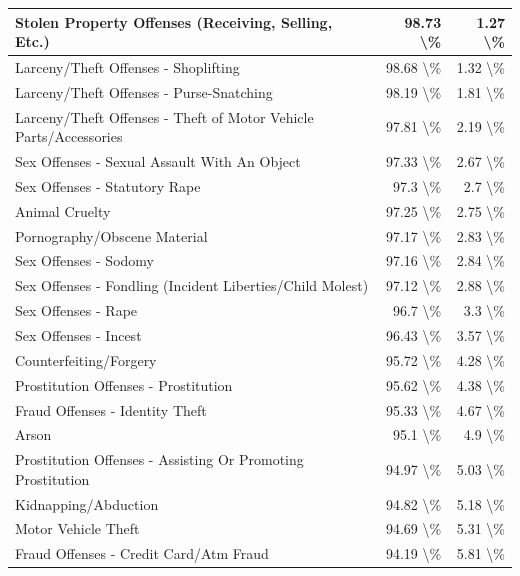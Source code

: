 \documentclass[
]{krantz}
\begin{document}
\begin{longtable}[t]{l|r|r}
\hline
Stolen Property Offenses (Receiving, Selling, Etc.) & 98.73 \textbackslash{}\% & 1.27 \textbackslash{}\%\\
\hline
Larceny/Theft Offenses - Shoplifting & 98.68 \textbackslash{}\% & 1.32 \textbackslash{}\%\\
\hline
Larceny/Theft Offenses - Purse-Snatching & 98.19 \textbackslash{}\% & 1.81 \textbackslash{}\%\\
\hline
Larceny/Theft Offenses - Theft of Motor Vehicle Parts/Accessories & 97.81 \textbackslash{}\% & 2.19 \textbackslash{}\%\\
\hline
Sex Offenses - Sexual Assault With An Object & 97.33 \textbackslash{}\% & 2.67 \textbackslash{}\%\\
\hline
Sex Offenses - Statutory Rape & 97.3 \textbackslash{}\% & 2.7 \textbackslash{}\%\\
\hline
Animal Cruelty & 97.25 \textbackslash{}\% & 2.75 \textbackslash{}\%\\
\hline
Pornography/Obscene Material & 97.17 \textbackslash{}\% & 2.83 \textbackslash{}\%\\
\hline
Sex Offenses - Sodomy & 97.16 \textbackslash{}\% & 2.84 \textbackslash{}\%\\
\hline
Sex Offenses - Fondling (Incident Liberties/Child Molest) & 97.12 \textbackslash{}\% & 2.88 \textbackslash{}\%\\
\hline
Sex Offenses - Rape & 96.7 \textbackslash{}\% & 3.3 \textbackslash{}\%\\
\hline
Sex Offenses - Incest & 96.43 \textbackslash{}\% & 3.57 \textbackslash{}\%\\
\hline
Counterfeiting/Forgery & 95.72 \textbackslash{}\% & 4.28 \textbackslash{}\%\\
\hline
Prostitution Offenses - Prostitution & 95.62 \textbackslash{}\% & 4.38 \textbackslash{}\%\\
\hline
Fraud Offenses - Identity Theft & 95.33 \textbackslash{}\% & 4.67 \textbackslash{}\%\\
\hline
Arson & 95.1 \textbackslash{}\% & 4.9 \textbackslash{}\%\\
\hline
Prostitution Offenses - Assisting Or Promoting Prostitution & 94.97 \textbackslash{}\% & 5.03 \textbackslash{}\%\\
\hline
Kidnapping/Abduction & 94.82 \textbackslash{}\% & 5.18 \textbackslash{}\%\\
\hline
Motor Vehicle Theft & 94.69 \textbackslash{}\% & 5.31 \textbackslash{}\%\\
\hline
Fraud Offenses - Credit Card/Atm Fraud & 94.19 \textbackslash{}\% & 5.81 \textbackslash{}\%\\

\end{longtable}
\end{document}
